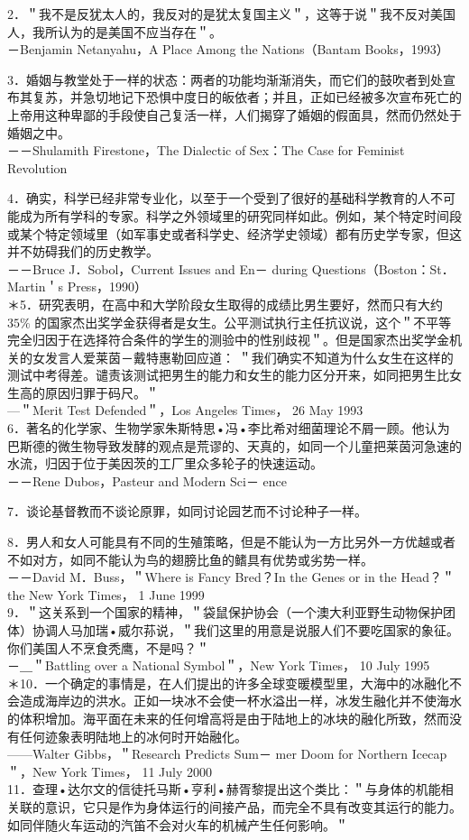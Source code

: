2．＂我不是反犹太人的，我反对的是犹太复国主义＂，这等于说＂我不反对美国人，我所认为的是美国不应当存在＂。\\
－Benjamin Netanyahu，A Place Among the Nations（Bantam Books，1993）

3．婚姻与教堂处于一样的状态：两者的功能均渐渐消失，而它们的鼓吹者到处宣布其复苏，并急切地记下恐惧中度日的皈依者；并且，正如已经被多次宣布死亡的上帝用这种卑鄙的手段使自己复活一样，人们揭穿了婚姻的假面具，然而仍然处于婚姻之中。\\
－－Shulamith Firestone，The Dialectic of Sex：The Case for Feminist Revolution

4．确实，科学已经非常专业化，以至于一个受到了很好的基础科学教育的人不可能成为所有学科的专家。科学之外领域里的研究同样如此。例如，某个特定时间段或某个特定领域里（如军事史或者科学史、经济学史领域）都有历史学专家，但这并不妨碍我们的历史教学。\\
－－Bruce J．Sobol，Current Issues and En－ during Questions（Boston：St．Martin＇s Press，1990）\\
＊5．研究表明，在高中和大学阶段女生取得的成绩比男生要好，然而只有大约 $35 \%$ 的国家杰出奖学金获得者是女生。公平测试执行主任抗议说，这个＂不平等完全归因于在选择符合条件的学生的测验中的性别歧视＂。但是国家杰出奖学金机关的女发言人爱莱茵－戴特惠勒回应道： ＂我们确实不知道为什么女生在这样的测试中考得差。谴责该测试把男生的能力和女生的能力区分开来，如同把男生比女生高的原因归罪于码尺。＂\\
—＂Merit Test Defended＂，Los Angeles Times， 26 May 1993\\
6．著名的化学家、生物学家朱斯特思•冯•李比希对细菌理论不屑一顾。他认为巴斯德的微生物导致发酵的观点是荒谬的、天真的，如同一个儿童把莱茵河急速的水流，归因于位于美因茨的工厂里众多轮子的快速运动。\\
－－Rene Dubos，Pasteur and Modern Sci－ ence

7．谈论基督教而不谈论原罪，如同讨论园艺而不讨论种子一样。

8．男人和女人可能具有不同的生殖策略，但是不能认为一方比另外一方优越或者不如对方，如同不能认为鸟的翅膀比鱼的鳍具有优势或劣势一样。\\
－－David M．Buss，＂Where is Fancy Bred？In the Genes or in the Head？＂the New York Times， 1 June 1999\\
9．＂这关系到一个国家的精神，＂袋鼠保护协会（一个澳大利亚野生动物保护团体）协调人马加瑞•威尔荪说，＂我们这里的用意是说服人们不要吃国家的象征。你们美国人不烹食秃鹰，不是吗？＂\\
－＿＂Battling over a National Symbol＂，New York Times， 10 July 1995\\
＊10．一个确定的事情是，在人们提出的许多全球变暖模型里，大海中的冰融化不会造成海岸边的洪水。正如一块冰不会使一杯水溢出一样，冰发生融化并不使海水的体积增加。海平面在未来的任何增高将是由于陆地上的冰块的融化所致，然而没有任何迹象表明陆地上的冰何时开始融化。\\
——Walter Gibbs，＂Research Predicts Sum－ mer Doom for Northern Icecap＂，New York Times， 11 July 2000\\
11．查理•达尔文的信徒托马斯•亨利•赫胥黎提出这个类比：＂与身体的机能相关联的意识，它只是作为身体运行的间接产品，而完全不具有改变其运行的能力。如同伴随火车运动的汽笛不会对火车的机械产生任何影响。＂

